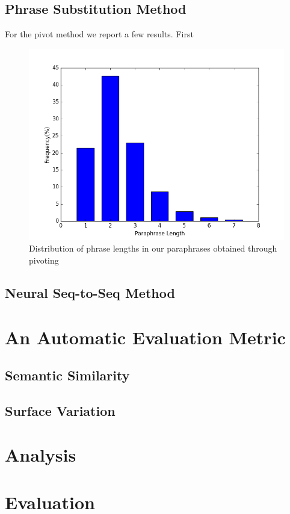 \documentclass[11pt,letterpaper]{article}
\begin{document}
\subsection{Phrase Substitution Method}
For the pivot method we report a few results. First	
\begin{figure}
\includegraphics[scale=0.4]{phrase_len}
\caption{Distribution of phrase lengths in our paraphrases obtained through pivoting}
\label{fig:para_length}
\end{figure}

\subsection{Neural Seq-to-Seq Method}

\section{An Automatic Evaluation Metric}
\subsection{Semantic Similarity}	
\subsection{Surface Variation}

\section{Analysis}

\section{Evaluation}
\end{document}
